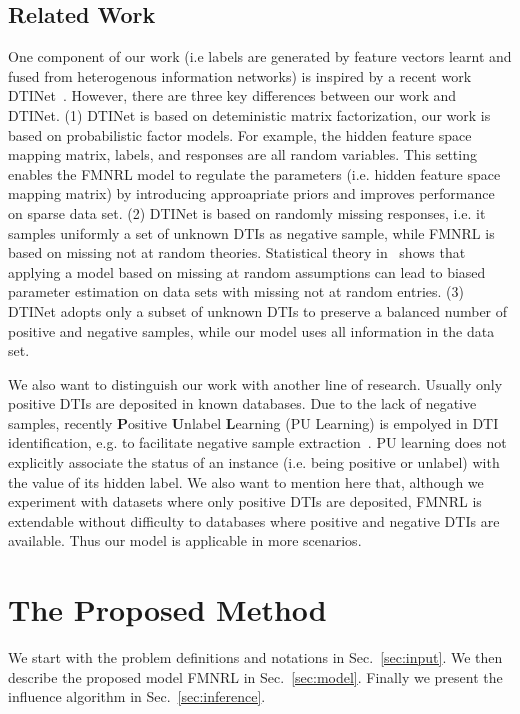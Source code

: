 \documentclass[sigconf,anonymous]{acmart}
\begin{document}
\subsection{Related Work}
One component of our work (i.e labels are generated by feature vectors learnt and fused from heterogenous information networks) is inspired by a recent work DTINet~\cite{Luo2017Network}. However, there are three key differences between our work and DTINet. (1) DTINet is based on deteministic matrix factorization, our work is based on probabilistic factor models. For example, the hidden feature space mapping matrix, labels, and responses are all random variables. This setting enables the FMNRL model to regulate the parameters (i.e. hidden feature space mapping matrix) by introducing approapriate priors and improves performance on sparse data set. (2) DTINet is based on randomly missing responses, i.e. it samples uniformly a set of unknown DTIs as negative sample, while FMNRL is based on missing not at random theories. Statistical theory in~\cite{Little1987Statistical} shows that applying a model based on missing at random assumptions can lead to biased parameter estimation on data sets with missing not at random entries. (3) DTINet adopts only a subset of unknown DTIs to preserve a balanced number of positive and negative samples, while our model uses all information in the data set.

We also want to distinguish our work with another line of research. Usually only positive DTIs are deposited in known databases. Due to the lack of negative samples, recently \textbf{P}ositive \textbf{U}nlabel \textbf{L}earning (PU Learning) is empolyed in DTI identification, e.g. to facilitate negative sample extraction~\cite{Peng2017Screening}. PU learning does not explicitly associate the status of an instance (i.e. being positive or unlabel) with the value of its hidden label. We also want to mention here that, although we experiment with datasets where only positive DTIs are deposited, FMNRL is extendable without difficulty to databases where positive and negative DTIs are available. Thus our model is applicable in more scenarios.



\section{The Proposed Method}\label{sec:method}
We start with the problem definitions and notations in Sec.~\ref{sec:input}. We then describe the proposed model FMNRL in Sec.~\ref{sec:model}. Finally we present the influence algorithm in Sec.~\ref{sec:inference}.
\end{document}
